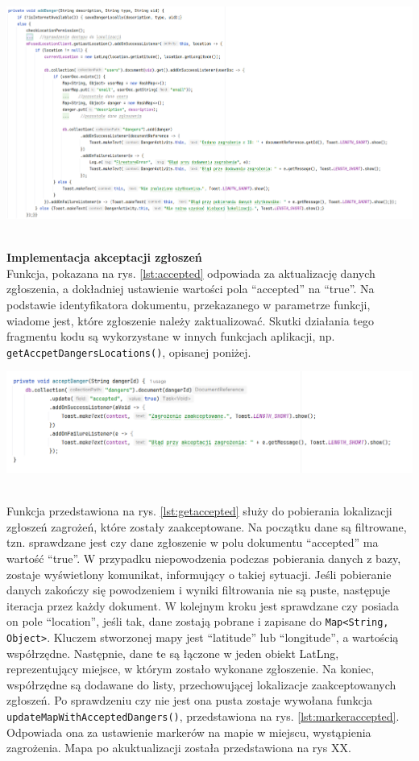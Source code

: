 \noindent
\begin{minipage}{\linewidth}
    \label{lst:danger}
    \centering
    \includegraphics[width=0.6\linewidth]{img/kod/imp-adddanger.png}
\end{minipage}
\\

\textbf{Implementacja akceptacji zgłoszeń} \\ 
Funkcja, pokazana na rys. \ref{lst:accepted} odpowiada za aktualizację danych zgłoszenia, a dokładniej ustawienie wartości pola “accepted” na “true”. Na podstawie identyfikatora dokumentu, przekazanego w parametrze funkcji, wiadome jest, które zgłoszenie należy zaktualizować. Skutki działania tego fragmentu kodu są wykorzystane w innych funkcjach aplikacji, np. \verb|getAccpetDangersLocations()|, opisanej poniżej.

\noindent
\begin{minipage}{\linewidth}
    \label{lst:accepted}
    \centering
    \includegraphics[width=0.6\linewidth]{img/kod/imp-acceptdanger.png}
\end{minipage}
\\

Funkcja przedstawiona na rys. \ref{lst:getaccepted} służy do pobierania lokalizacji zgłoszeń zagrożeń, które zostały zaakceptowane. Na początku dane są filtrowane, tzn. sprawdzane jest czy dane zgłoszenie w polu dokumentu “accepted” ma wartość “true”. W przypadku niepowodzenia podczas pobierania danych z bazy, zostaje wyświetlony komunikat, informujący o takiej sytuacji. Jeśli pobieranie danych zakończy się powodzeniem i wyniki filtrowania nie są puste, następuje iteracja przez każdy dokument. W kolejnym kroku jest sprawdzane czy posiada on pole “location”, jeśli tak, dane zostają pobrane i zapisane do \verb|Map<String, Object>|. Kluczem stworzonej mapy jest “latitude” lub “longitude”, a wartością współrzędne. Następnie, dane te są łączone w jeden obiekt LatLng, reprezentujący miejsce, w którym zostało wykonane zgłoszenie. Na koniec, współrzędne są dodawane do listy, przechowującej lokalizacje zaakceptowanych zgłoszeń. Po sprawdzeniu czy nie jest ona pusta zostaje wywołana funkcja \verb|updateMapWithAcceptedDangers()|, przedstawiona na rys. \ref{lst:markeraccepted}. Odpowiada ona za ustawienie markerów na mapie w miejscu, wystąpienia zagrożenia. Mapa po akuktualizacji została przedstawiona na rys XX.\\

